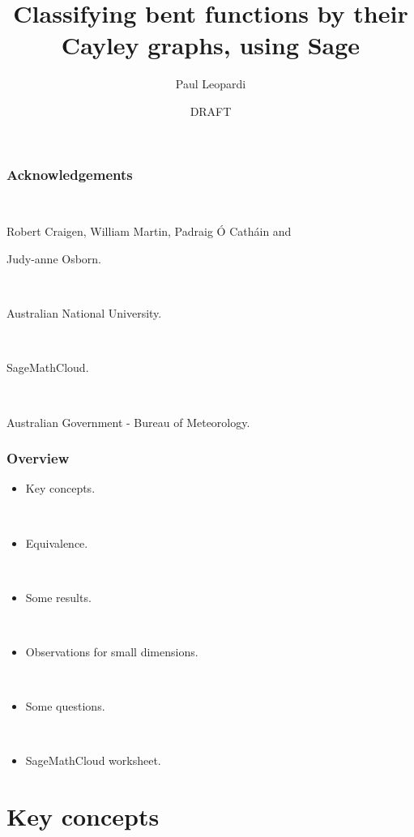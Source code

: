 \documentclass[pdf,sprung,slideColor,nocolorBG]{beamer}
\title{Classifying bent functions by their Cayley graphs, using Sage}
\author{Paul Leopardi}
\date{DRAFT}
\institute{Australian Government - Bureau of Meteorology.}
\begin{document}
\frame{\titlepage}
\begin{frame}
\frametitle{Acknowledgements}
\begin{center}
~
 
Robert Craigen, William Martin,
Padraig {\'O} Cath{\'a}in and 

Judy-anne Osborn.

~

Australian National University.

~

SageMathCloud.

~

Australian Government - Bureau of Meteorology.
\end{center}
\end{frame}

\begin{frame}
\frametitle{Overview}
\begin{itemize}
\item
Key concepts.

~

\item
Equivalence.

~

\item
Some results.

~

\item
Observations for small dimensions.

~

\item
Some questions.

~

\item
SageMathCloud worksheet.
\end{itemize}
 
\end{frame}

\section{Key concepts}
\end{document}
